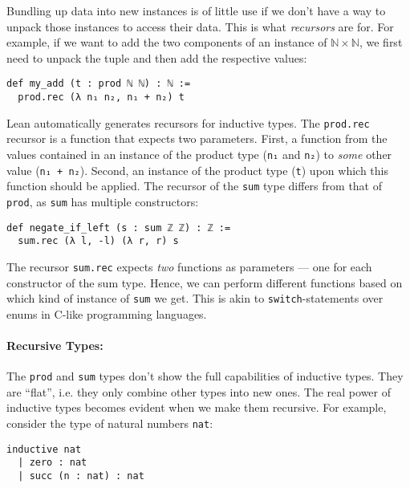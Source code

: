 Bundling up data into new instances is of little use if we don't have a way to unpack those instances to access their data.
This is what \emph{recursors} are for.
For example, if we want to add the two components of an instance of $\mathbb{N} \times \mathbb{N}$, we first need to unpack the tuple and then add the respective values:

\begin{lstlisting}
def my_add (t : prod ℕ ℕ) : ℕ :=
  prod.rec (λ n₁ n₂, n₁ + n₂) t
\end{lstlisting}

\noindent Lean automatically generates recursors for inductive types.
The \lstinline{prod.rec} recursor is a function that expects two parameters. 
First, a function from the values contained in an instance of the product type (\lstinline{n₁} and \lstinline{n₂}) to \emph{some} other value (\lstinline{n₁ + n₂}).
Second, an instance of the product type (\lstinline{t}) upon which this function should be applied.
The recursor of the \lstinline{sum} type differs from that of \lstinline{prod}, as \lstinline{sum} has multiple constructors:

\begin{lstlisting}
def negate_if_left (s : sum ℤ ℤ) : ℤ :=
  sum.rec (λ l, -l) (λ r, r) s
\end{lstlisting}

\noindent The recursor \lstinline{sum.rec} expects \emph{two} functions as parameters --- one for each constructor of the sum type. 
Hence, we can perform different functions based on which kind of instance of \lstinline{sum} we get. 
This is akin to \verb|switch|-statements over enums in C-like programming languages.

\break

\paragraph{Recursive Types:}

The \lstinline{prod} and \lstinline{sum} types don't show the full capabilities of inductive types.
They are ``flat'', i.e. they only combine other types into new ones.
The real power of inductive types becomes evident when we make them recursive.
For example, consider the type of natural numbers \lstinline{nat}:

\begin{lstlisting}
inductive nat
  | zero : nat
  | succ (n : nat) : nat
\end{lstlisting}

